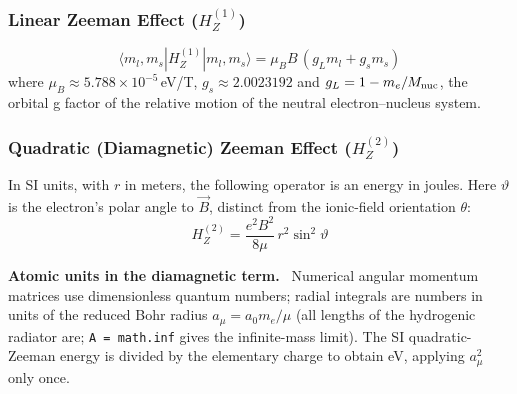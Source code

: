 \documentclass[11pt,a4paper]{article}
\newenvironment{implnote}[1][Implementation]{%
  \par\smallskip\noindent\begin{lrbox}{\notebox}\setlength{\fboxsep}{6pt}\begin{minipage}{\dimexpr\linewidth-2\fboxsep-2\fboxrule\relax}\small\textbf{#1.}\ }{%
  \end{minipage}\end{lrbox}\setlength{\fboxsep}{6pt}\fcolorbox{noteframe}{notebg}{\usebox{\notebox}}\par\smallskip}
\numberwithin{equation}{section}
\begin{document}
\subsubsection{\texorpdfstring{Linear Zeeman Effect ($H_Z^{(1)}$)}{Linear Zeeman Effect (first order)}}
\begin{equation}
\langle m_l, m_s | H_Z^{(1)} | m_l, m_s \rangle = \mu_B B\,(g_L m_l + g_s m_s)
\end{equation}
where $\mu_B \approx 5.788\times10^{-5}$\,eV/T, $g_s \approx 2.0023192$ and $g_L = 1 - m_e/M_{\rm nuc}$, the orbital g factor of the relative motion of the neutral electron--nucleus system.

\subsubsection{\texorpdfstring{Quadratic (Diamagnetic) Zeeman Effect ($H_Z^{(2)}$)}{Quadratic (Diamagnetic) Zeeman Effect (second order)}}
In SI units, with $r$ in meters, the following operator is an energy in joules.
Here $\vartheta$ is the electron's polar angle to $\vec B$, distinct from the
ionic-field orientation $\theta$:
\begin{equation}
H_Z^{(2)} = \frac{e^2 B^2}{8 \mu}\,r^2\sin^2\vartheta
\end{equation}
\begin{implnote}[Atomic units in the diamagnetic term]
Numerical angular momentum matrices use dimensionless quantum numbers; radial
integrals are numbers in units of the reduced Bohr radius $a_\mu = a_0 m_e/\mu$ (all
lengths of the hydrogenic radiator are; \texttt{A = math.inf} gives the infinite-mass
limit). The SI quadratic-Zeeman energy is divided by the elementary charge to obtain eV,
applying $a_\mu^2$ only once.
\end{implnote}
\end{document}
